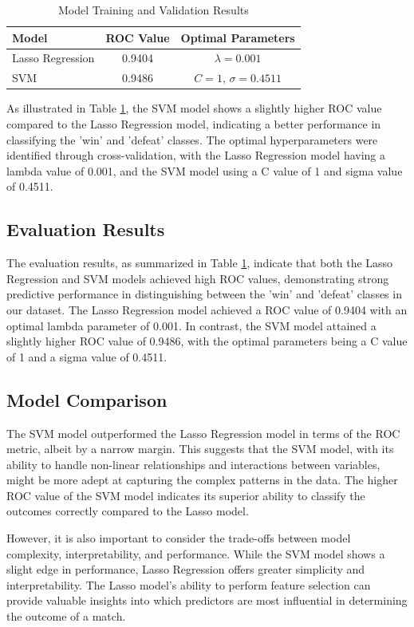 \documentclass[12pt]{article}
\begin{document}
\begin{table}[ht]
	\centering
	\caption{Model Training and Validation Results}
	\label{table:training_results}
	\begin{tabular}{lcc}
		\hline
		\textbf{Model} & \textbf{ROC Value} & \textbf{Optimal Parameters} \\
		\hline
		Lasso Regression & 0.9404 & $\lambda = 0.001$ \\
		SVM & 0.9486 & $C = 1$, $\sigma = 0.4511$ \\
		\hline
	\end{tabular}
\end{table}

As illustrated in Table \ref{table:training_results}, the SVM model shows a slightly higher ROC value compared to the Lasso Regression model, indicating a better performance in classifying the 'win' and 'defeat' classes. The optimal hyperparameters were identified through cross-validation, with the Lasso Regression model having a lambda value of 0.001, and the SVM model using a C value of 1 and sigma value of 0.4511.

\subsection{Evaluation Results}
The evaluation results, as summarized in Table \ref{table:training_results}, indicate that both the Lasso Regression and SVM models achieved high ROC values, demonstrating strong predictive performance in distinguishing between the 'win' and 'defeat' classes in our dataset. The Lasso Regression model achieved a ROC value of 0.9404 with an optimal lambda parameter of 0.001. In contrast, the SVM model attained a slightly higher ROC value of 0.9486, with the optimal parameters being a C value of 1 and a sigma value of 0.4511.

\subsection{Model Comparison}
The SVM model outperformed the Lasso Regression model in terms of the ROC metric, albeit by a narrow margin. This suggests that the SVM model, with its ability to handle non-linear relationships and interactions between variables, might be more adept at capturing the complex patterns in the data. The higher ROC value of the SVM model indicates its superior ability to classify the outcomes correctly compared to the Lasso model.

However, it is also important to consider the trade-offs between model complexity, interpretability, and performance. While the SVM model shows a slight edge in performance, Lasso Regression offers greater simplicity and interpretability. The Lasso model's ability to perform feature selection can provide valuable insights into which predictors are most influential in determining the outcome of a match.
\end{document}
